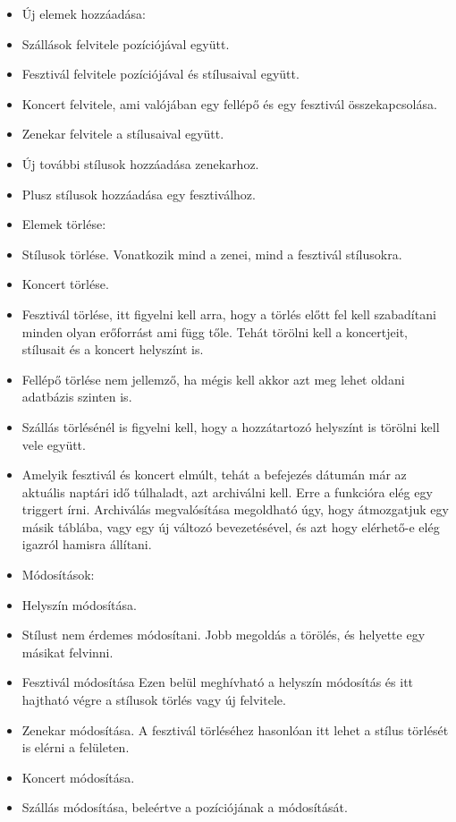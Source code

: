 \begin{itemize}
\item Új elemek hozzáadása:
\item Szállások felvitele pozíciójával együtt.
\item Fesztivál felvitele pozíciójával és stílusaival együtt.
\item Koncert felvitele, ami valójában egy fellépő és egy fesztivál összekapcsolása.
\item Zenekar felvitele a stílusaival együtt.
\item Új további stílusok hozzáadása zenekarhoz. 
\item Plusz stílusok hozzáadása egy fesztiválhoz.

\item Elemek törlése:
\item Stílusok törlése. Vonatkozik mind a zenei, mind a fesztivál stílusokra. 
\item Koncert törlése.
\item Fesztivál törlése, itt figyelni kell arra, hogy a törlés előtt fel kell szabadítani minden olyan erőforrást ami függ tőle. Tehát törölni kell a koncertjeit, stílusait és a koncert helyszínt is.
\item Fellépő törlése nem jellemző, ha mégis kell akkor azt meg lehet oldani adatbázis szinten is.
\item Szállás törlésénél is figyelni kell, hogy a hozzátartozó helyszínt is törölni kell vele együtt.
\item Amelyik fesztivál és koncert elmúlt, tehát a befejezés dátumán már az aktuális naptári idő  túlhaladt, azt archiválni kell. Erre a funkcióra elég egy triggert írni. Archiválás megvalósítása megoldható úgy, hogy átmozgatjuk egy másik táblába, vagy egy új változó bevezetésével, és azt hogy elérhető-e elég igazról hamisra állítani.

\item Módosítások:
\item Helyszín módosítása.
\item Stílust nem érdemes módosítani. Jobb megoldás a törölés, és helyette egy másikat felvinni.
\item Fesztivál módosítása Ezen belül meghívható a helyszín módosítás és itt hajtható végre a stílusok törlés vagy új felvitele.
\item Zenekar módosítása. A fesztivál törléséhez hasonlóan itt lehet a stílus törlését is elérni a felületen.
\item Koncert módosítása.
\item Szállás módosítása, beleértve a pozíciójának a módosítását. 
\end{itemize}

